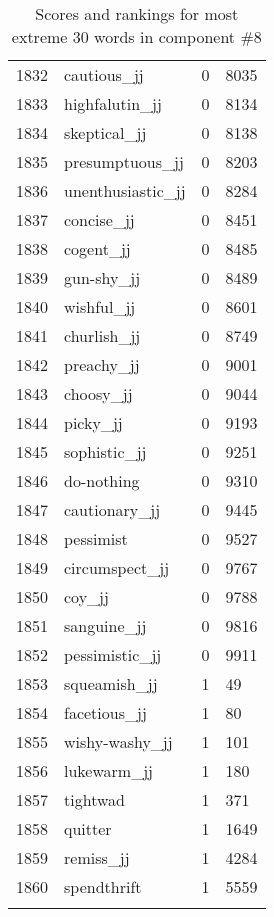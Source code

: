 \begin{longtable}[!htbp]{| rlr@{.}l |}
    1832 & cautious\_jj & 0 & 8035 \\
    1833 & highfalutin\_jj & 0 & 8134 \\
    1834 & skeptical\_jj & 0 & 8138 \\
    1835 & presumptuous\_jj & 0 & 8203 \\
    1836 & unenthusiastic\_jj & 0 & 8284 \\
    1837 & concise\_jj & 0 & 8451 \\
    1838 & cogent\_jj & 0 & 8485 \\
    1839 & gun-shy\_jj & 0 & 8489 \\
    1840 & wishful\_jj & 0 & 8601 \\
    1841 & churlish\_jj & 0 & 8749 \\
    1842 & preachy\_jj & 0 & 9001 \\
    1843 & choosy\_jj & 0 & 9044 \\
    1844 & picky\_jj & 0 & 9193 \\
    1845 & sophistic\_jj & 0 & 9251 \\
    1846 & do-nothing & 0 & 9310 \\
    1847 & cautionary\_jj & 0 & 9445 \\
    1848 & pessimist & 0 & 9527 \\
    1849 & circumspect\_jj & 0 & 9767 \\
    1850 & coy\_jj & 0 & 9788 \\
    1851 & sanguine\_jj & 0 & 9816 \\
    1852 & pessimistic\_jj & 0 & 9911 \\
    1853 & squeamish\_jj & 1 & 49 \\
    1854 & facetious\_jj & 1 & 80 \\
    1855 & wishy-washy\_jj & 1 & 101 \\
    1856 & lukewarm\_jj & 1 & 180 \\
    1857 & tightwad & 1 & 371 \\
    1858 & quitter & 1 & 1649 \\
    1859 & remiss\_jj & 1 & 4284 \\
    1860 & spendthrift & 1 & 5559 \\
    \hline
    \caption{Scores and rankings for most extreme 30 words in component \#8} \\
\end{longtable}
